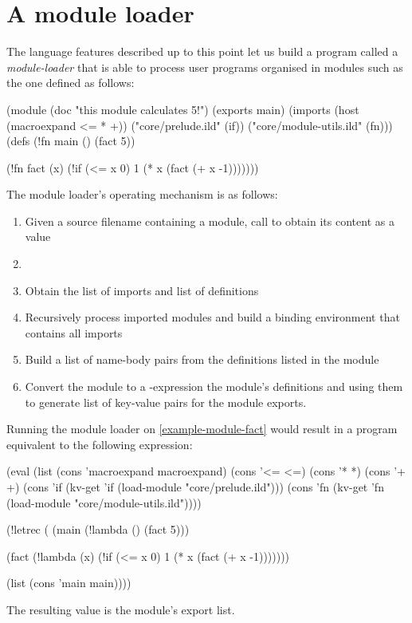 \section{A module loader}
\label{module-loader}
The language features described up to this point let us build a program
called a \emph{module-loader} that is able to process user programs
organised in modules such as the one defined as follows:
\begin{listingbox}\begin{ildcode}
(module
  (doc "this module calculates 5!")
  (exports main)
  (imports
    (host (macroexpand <= * +))
    ("core/prelude.ild" (if))
    ("core/module-utils.ild" (fn)))
  (defs
    (!fn main () (fact 5))

    (!fn fact (x)
      (!if (<= x 0)
        1
        (* x (fact (+ x -1)))))))
\end{ildcode}\end{listingbox}
\label{example-module-fact}

The module loader's operating mechanism is as follows:
\begin{enumerate}
\item Given a source filename containing a module, call  to obtain its
content as a value
\item {}
\item Obtain the list of imports and list of definitions 
\item Recursively process imported modules and build a binding environment 
that contains all imports
\item Build a list of name-body pairs from the definitions listed in the module
\item Convert the module to a -expression 
the module's definitions and using them to generate
list of key-value pairs for the module exports.
\end{enumerate}

Running the module loader on \cref{example-module-fact} would result in a program
equivalent to the following expression:
\begin{listingbox}\begin{ildcode}
(eval
  (list
    (cons 'macroexpand macroexpand)
    (cons '<= <=)
    (cons '* *)
    (cons '+ +)
    (cons 'if
      (kv-get 'if (load-module "core/prelude.ild")))
    (cons 'fn
      (kv-get 'fn (load-module "core/module-utils.ild"))))

  (!letrec (
    (main (!lambda () (fact 5)))

    (fact (!lambda (x)
      (!if (<= x 0)
        1
        (* x (fact (+ x -1)))))))

    (list (cons 'main main))))
\end{ildcode}\end{listingbox}
\label{fact-module-letrec}
The resulting value is the module's export list.
